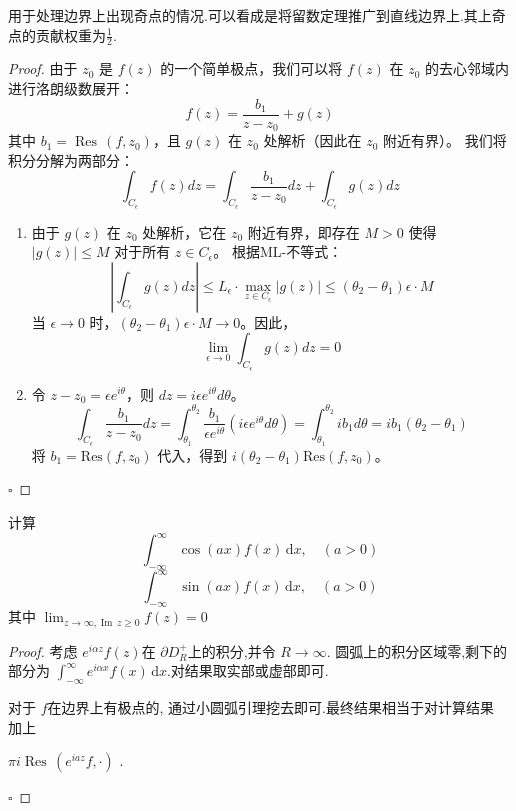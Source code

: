\documentclass[../../复变函数.tex]{subfiles}
\begin{document}
\begin{note}
    用于处理边界上出现奇点的情况.可以看成是将留数定理推广到直线边界上.其上奇点的贡献权重为\(  \frac{1}{2}  \). 
\end{note}
\begin{proof}
    由于 $z_0$ 是 $f(z)$ 的一个简单极点，我们可以将 $f(z)$ 在 $z_0$ 的去心邻域内进行洛朗级数展开：
$$f(z) = \frac{b_1}{z-z_0} + g(z)$$
其中 $b_1 = \operatorname{Res}\,(f, z_0)$，且 $g(z)$ 在 $z_0$ 处解析（因此在 $z_0$ 附近有界）。
我们将积分分解为两部分：
$$\int_{C_\epsilon} f(z) dz = \int_{C_\epsilon} \frac{b_1}{z-z_0} dz + \int_{C_\epsilon} g(z) dz$$



\begin{enumerate}
    \item 由于 $g(z)$ 在 $z_0$ 处解析，它在 $z_0$ 附近有界，即存在 $M > 0$ 使得 $|g(z)| \le M$ 对于所有 $z \in C_\epsilon$。
根据ML-不等式：
$$\left| \int_{C_\epsilon} g(z) dz \right| \le L_\epsilon \cdot \max_{z \in C_\epsilon} |g(z)| \le (\theta_2 - \theta_1)\epsilon \cdot M$$
当 $\epsilon \to 0$ 时，$(\theta_2 - \theta_1)\epsilon \cdot M \to 0$。因此，$$\lim_{\epsilon \to 0} \int_{C_\epsilon} g(z) dz = 0$$
\item 令 $z - z_0 = \epsilon e^{i\theta}$，则 $dz = i\epsilon e^{i\theta} d\theta$。
$$\int_{C_\epsilon} \frac{b_1}{z-z_0} dz = \int_{\theta_1}^{\theta_2} \frac{b_1}{\epsilon e^{i\theta}} (i\epsilon e^{i\theta} d\theta) = \int_{\theta_1}^{\theta_2} i b_1 d\theta = i b_1 (\theta_2 - \theta_1)$$
将 $b_1 = \text{Res}(f, z_0)$ 代入，得到 $i (\theta_2 - \theta_1) \text{Res}(f, z_0)$。
\end{enumerate}


    \hfill $\square$
\end{proof}

\begin{method}
    计算 \[
    \int_{-\infty}^{\infty} \cos \left( ax \right)  f\left( x \right)\,\mathrm{d} x ,\quad (a> 0)
    \]\[
    \int_{-\infty}^{\infty}\sin \left( ax \right)f\left( x \right)\,\mathrm{d} x,\quad \left( a> 0 \right)   
    \]其中 \(  \lim_{z\to \infty,\operatorname{Im}\,z\ge 0}f\left( z \right)= 0   \) 
\end{method}
\begin{proof}
    
    考虑 \(  e^{i\alpha z}f\left( z \right)   \)在 \(   \partial D_{R}^{+ } \)上的积分,并令 \(  R\to \infty  \).   圆弧上的积分区域零,剩下的部分为 \(  \int_{-\infty}^{\infty}e^{i\alpha x}f\left( x \right)\,\mathrm{d} x   \).对结果取实部或虚部即可. 

    对于 \(  f  \)在边界上有极点的, 通过小圆弧引理挖去即可.最终结果相当于对计算结果 加上 
    
    \(  \pi i\operatorname{Res}\,\left( e^{ia z}f,\cdot  \right)   \) .

    \hfill $\square$
\end{proof}
\end{document}

